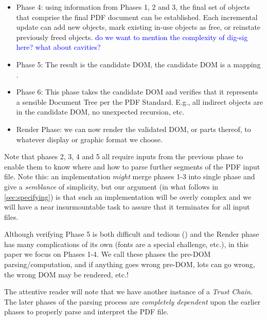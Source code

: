 \begin{itemize}
\item Phase 4: using information from Phases 1, 2 and 3, the final set of objects that comprise the final PDF document can be established. Each incremental update can add new objects, mark existing in-use objects as free, or reinstate previously freed objects. \textcolor{blue}{do we want to mention the complexity of dig-sig here? what about cavities?} 
\item Phase 5:  The result is the candidate DOM, 
  the candidate DOM is a mapping .
\item Phase 6: This phase takes the candidate DOM and verifies that
  it represents a sensible Document Tree per the PDF Standard.  E.g.,
  all indirect objects are in the candidate DOM, no unexpected recursion,
  etc.
\item Render Phase: we can now render the validated DOM, or parts thereof, to
  whatever display or graphic format we choose.
\end{itemize}

Note that phases 2, 3, 4 and 5
all require inputs from the previous phase to enable them to know where and
how to parse further segments of the PDF input file.
%
Note this: an implementation \emph{might} merge phases 1-3 into single phase
and give a \emph{semblance} of simplicity, but our argument (in what
follows in \cref{sec:specifying}) is that such an implementation will be
overly complex and we will have a near insurmountable task to assure that it
terminates for all input files.


Although verifying Phase 5 is both difficult and tedious
()
and the Render phase has many complications of its own (fonts are
a special challenge, etc.), in this paper we focus on Phases 1-4.
We call these phases the pre-DOM parsing/computation, and if anything
goes wrong pre-DOM, lots can go wrong, the wrong DOM may be rendered, etc.!


The attentive reader will note that we have another instance of a \emph{Trust
Chain}.  The later phases of the parsing process are \emph{completely
dependent} upon the earlier phases to properly parse and interpret the PDF
file.

